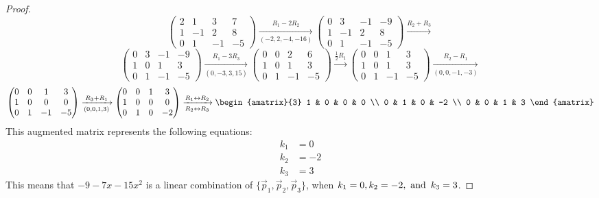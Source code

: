 \begin{enumerate}
\begin{proof}
\[      \begin{pmatrix}
        2 & 1  & 3  & 7  \\
        1 & -1 & 2  & 8  \\
        0 & 1  & -1 & -5
      \end{pmatrix} \xrightarrow[(-2,2,-4,-16)]{R_1 - 2R_2}
      \begin{pmatrix}
        0 & 3  & -1 & -9 \\
        1 & -1 & 2  & 8  \\
        0 & 1  & -1 & -5
      \end{pmatrix} \xrightarrow{R_2 + R_3}
    \]
    \[
      \begin{pmatrix}
        0 & 3 & -1 & -9 \\
        1 & 0 & 1  & 3  \\
        0 & 1 & -1 & -5
      \end{pmatrix} \xrightarrow[(0,-3,3,15)]{R_1 - 3R_3}
      \begin{pmatrix}
        0 & 0 & 2  & 6  \\
        1 & 0 & 1  & 3  \\
        0 & 1 & -1 & -5
      \end{pmatrix} \xrightarrow{\frac{1}{2}R_1}
      \begin{pmatrix}
        0 & 0 & 1  & 3  \\
        1 & 0 & 1  & 3  \\
        0 & 1 & -1 & -5
      \end{pmatrix} \xrightarrow[(0,0,-1,-3)]{R_2 - R_1}
    \]
    \[
      \begin{pmatrix}
        0 & 0 & 1  & 3  \\
        1 & 0 & 0  & 0  \\
        0 & 1 & -1 & -5
      \end{pmatrix} \xrightarrow[(0,0,1,3)]{R_3 + R_1}
      \begin{pmatrix}
        0 & 0 & 1 & 3  \\
        1 & 0 & 0 & 0  \\
        0 & 1 & 0 & -2
      \end{pmatrix} \xrightarrow[R_2 \leftrightarrow R_3]{R_1 \leftrightarrow R_2}
      \begin{amatrix}{3}
        1 & 0 & 0 & 0  \\
        0 & 1 & 0 & -2 \\
        0 & 0 & 1 & 3
      \end{amatrix}
    \]
    This augmented matrix represents the following equations:
    \begin{align*}
      k_1 & = 0  \\
      k_2 & = -2 \\
      k_3 & = 3
    \end{align*}
    This means that $-9-7x-15x^2$ is a linear combination of $\{\vec{p}_1,\vec{p}_2,\vec{p}_3\}$, when $k_1 = 0, k_2 = -2, \operatorname{~\text{and}~} k_3 = 3$.
  \end{proof}
\end{enumerate}

